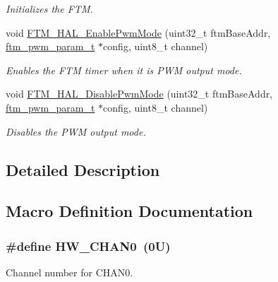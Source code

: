 \begin{DoxyCompactItemize}
\begin{DoxyCompactList}\small\item\em Initializes the F\+TM. \end{DoxyCompactList}\item 
void \hyperlink{group__ftm__hal_gaf216af3b7a82d1183cf88df75c4de5dc}{F\+T\+M\+\_\+\+H\+A\+L\+\_\+\+Enable\+Pwm\+Mode} (uint32\+\_\+t ftm\+Base\+Addr, \hyperlink{group__ftm__hal_ga6d4c723a5bafd692b51acaecd62cdd2a}{ftm\+\_\+pwm\+\_\+param\+\_\+t} $\ast$config, uint8\+\_\+t channel)
\begin{DoxyCompactList}\small\item\em Enables the F\+TM timer when it is P\+WM output mode. \end{DoxyCompactList}\item 
void \hyperlink{group__ftm__hal_gac089e089bee8f1223ef2a8489e529a5b}{F\+T\+M\+\_\+\+H\+A\+L\+\_\+\+Disable\+Pwm\+Mode} (uint32\+\_\+t ftm\+Base\+Addr, \hyperlink{group__ftm__hal_ga6d4c723a5bafd692b51acaecd62cdd2a}{ftm\+\_\+pwm\+\_\+param\+\_\+t} $\ast$config, uint8\+\_\+t channel)
\begin{DoxyCompactList}\small\item\em Disables the P\+WM output mode. \end{DoxyCompactList}\end{DoxyCompactItemize}


\subsection{Detailed Description}


\subsection{Macro Definition Documentation}
\subsubsection[{\texorpdfstring{H\+W\+\_\+\+C\+H\+A\+N0}{HW_CHAN0}}]{\setlength{\rightskip}{0pt plus 5cm}\#define H\+W\+\_\+\+C\+H\+A\+N0~(0\+U)}\hypertarget{group__ftm__hal_gab07f9ba36567d9841387018178ce769b}{}\label{group__ftm__hal_gab07f9ba36567d9841387018178ce769b}
Channel number for C\+H\+A\+N0. 

